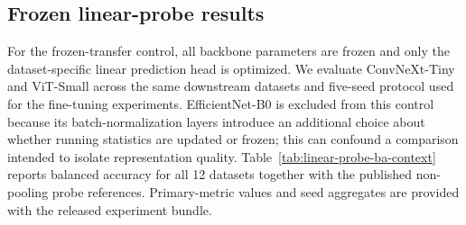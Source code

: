 \FloatBarrier
\subsection{Frozen linear-probe results}
\label{app:linear-probe}

For the frozen-transfer control, all backbone parameters are frozen and only
the dataset-specific linear prediction head is optimized. We evaluate
ConvNeXt-Tiny and ViT-Small across the same downstream datasets and five-seed
protocol used for the fine-tuning experiments. EfficientNet-B0 is excluded
from this control because its batch-normalization layers introduce an
additional choice about whether running statistics are updated or frozen;
this can confound a comparison intended to isolate representation quality.
Table~\ref{tab:linear-probe-ba-context} reports balanced accuracy for all 12
datasets together with the published non-pooling probe references.
Primary-metric values and seed aggregates are provided with the released
experiment bundle.

